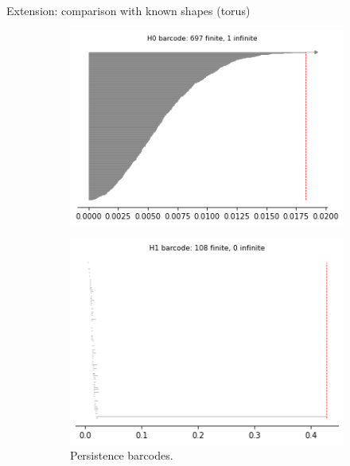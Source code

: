 \documentclass[xcolor={dvipsnames,svgnames}]{beamer}
\begin{document}
\begin{frame}{Extension: comparison with known shapes (torus)}
\begin{figure}[H]
\begin{subfigure}[b]{0.25\textwidth}
\end{subfigure}
\begin{subfigure}[b]{0.2\textwidth}
    \includegraphics[width=\textwidth]{figures/torus_H0_barcode.png}
    \caption{}
\end{subfigure}
\begin{subfigure}[b]{0.2\textwidth}
    \includegraphics[width=\textwidth]{figures/torus_H1_barcode.png}
        \caption{Persistence barcodes.}
\end{subfigure}
\begin{subfigure}[b]{0.2\textwidth}

\end{subfigure}
\end{figure}
\end{frame}
\end{document}

